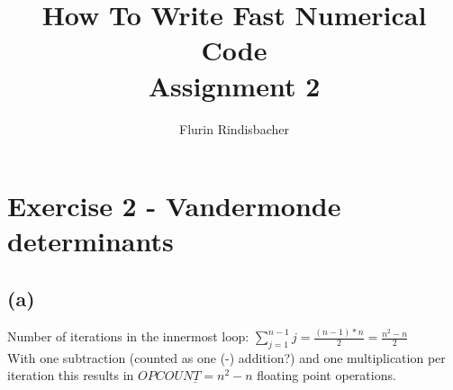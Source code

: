 \documentclass[10pt,a4paper,oneside,notitlepage]{report}
\author{Flurin Rindisbacher}
\title{How To Write Fast Numerical Code \\ \vspace{6 mm} \textbf{Assignment 2}}
\begin{document}
\maketitle

\section*{Exercise 2 - Vandermonde determinants}

\subsection*{(a)}
Number of iterations in the innermost loop: $\sum\limits_{j=1}^{n-1} j = \frac{(n-1)*n}{2} = \frac{n^2 -n}{2}$ \\
With one subtraction (counted as one (-) addition?) and one multiplication per iteration this results in $\underline{OPCOUNT = n^2-n}$ floating point operations.  
\end{document}
